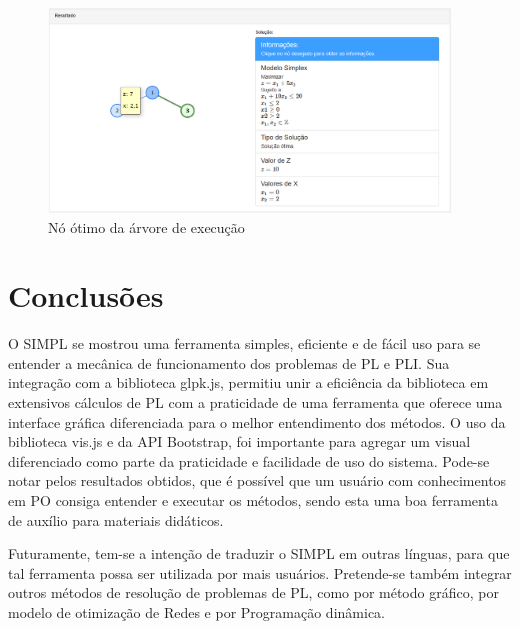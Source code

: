 \documentclass [11pt]{articleSBPO}
\begin{document}
\begin{figure}[!h]
	\centering
	\includegraphics[width=0.95\textwidth]{img/bbno3.png}
	\caption[]{Nó ótimo da árvore de execução}
	\label{fig:bbno3}
\end{figure}

\section{Conclusões}\label{sec:conclusao}
O SIMPL se mostrou uma ferramenta simples, eficiente e de fácil uso para se entender a mecânica de funcionamento dos problemas de PL e PLI. Sua integração com a biblioteca glpk.js, permitiu unir a eficiência da biblioteca em extensivos cálculos de PL com a praticidade de uma ferramenta que oferece uma interface gráfica diferenciada para o melhor entendimento dos métodos. O uso da biblioteca vis.js e da API Bootstrap, foi importante para agregar um visual diferenciado como parte da praticidade e facilidade de uso do sistema. Pode-se notar pelos resultados obtidos, que é possível que um usuário com conhecimentos em PO consiga entender e executar os métodos, sendo esta uma boa ferramenta de auxílio para materiais didáticos.

Futuramente, tem-se a intenção de traduzir o SIMPL em outras línguas, para que tal ferramenta possa ser utilizada por mais usuários. Pretende-se também integrar outros métodos de resolução de problemas de PL, como por método gráfico, por modelo de otimização de Redes e por Programação dinâmica.


\end{document}
